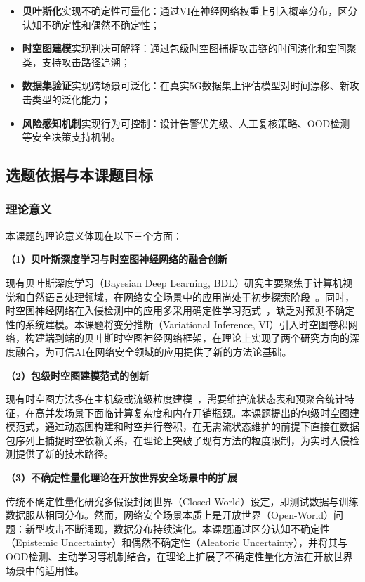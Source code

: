 \begin{itemize}
  \item \textbf{贝叶斯化}实现不确定性可量化：通过VI在神经网络权重上引入概率分布，区分认知不确定性和偶然不确定性；
  \item \textbf{时空图建模}实现判决可解释：通过包级时空图捕捉攻击链的时间演化和空间聚类，支持攻击路径追溯；
  \item \textbf{数据集验证}实现跨场景可泛化：在真实5G数据集上评估模型对时间漂移、新攻击类型的泛化能力；
  \item \textbf{风险感知机制}实现行为可控制：设计告警优先级、人工复核策略、OOD检测等安全决策支持机制。
\end{itemize}


\subsection{选题依据与本课题目标}

\subsubsection{理论意义}

本课题的理论意义体现在以下三个方面：

\textbf{（1）贝叶斯深度学习与时空图神经网络的融合创新}

现有贝叶斯深度学习（Bayesian Deep Learning, BDL）研究主要聚焦于计算机视觉和自然语言处理领域，在网络安全场景中的应用尚处于初步探索阶段~\cite{BCNN-IDS}。同时，时空图神经网络在入侵检测中的应用多采用确定性学习范式~\cite{E-ResGAT,TCG-IDS}，缺乏对预测不确定性的系统建模。本课题将变分推断（Variational Inference, VI）引入时空图卷积网络，构建端到端的贝叶斯时空图神经网络框架，在理论上实现了两个研究方向的深度融合，为可信AI在网络安全领域的应用提供了新的方法论基础。

\textbf{（2）包级时空图建模范式的创新}

现有时空图方法多在主机级或流级粒度建模~\cite{EvolveGCN,PPT-GNN}，需要维护流状态表和预聚合统计特征，在高并发场景下面临计算复杂度和内存开销瓶颈。本课题提出的包级时空图建模范式，通过动态图构建和时空并行卷积，在无需流状态维护的前提下直接在数据包序列上捕捉时空依赖关系，在理论上突破了现有方法的粒度限制，为实时入侵检测提供了新的技术路径。

\textbf{（3）不确定性量化理论在开放世界安全场景中的扩展}

传统不确定性量化研究多假设封闭世界（Closed-World）设定，即测试数据与训练数据服从相同分布。然而，网络安全场景本质上是开放世界（Open-World）问题：新型攻击不断涌现，数据分布持续演化。本课题通过区分认知不确定性（Epistemic Uncertainty）和偶然不确定性（Aleatoric Uncertainty），并将其与OOD检测、主动学习等机制结合，在理论上扩展了不确定性量化方法在开放世界场景中的适用性。

